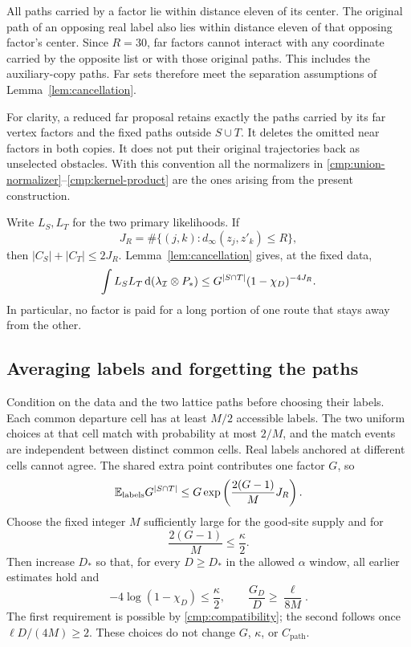 All paths carried by a factor lie within distance eleven of its center.
The original path of an opposing real label also lies within distance eleven
of that opposing factor's center. Since $R=30$, far factors cannot interact
with any coordinate carried by the opposite list or with those original
paths. This includes the auxiliary-copy paths. Far sets therefore meet the
separation assumptions of Lemma~\ref{lem:cancellation}.

For clarity, a reduced far proposal retains exactly the paths carried by
its far vertex factors and the fixed paths outside $S\cup T$. It deletes
the omitted near factors in both copies. It does not put their original
trajectories back as unselected obstacles. With this convention all the
normalizers in \eqref{cmp:union-normalizer}--\eqref{cmp:kernel-product}
are the ones arising from the present construction.

Write $L_S,L_T$ for the two primary likelihoods. If
\[
 J_R=\#\{(j,k):d_\infty(z_j,z'_k)\le R\},
\]
then $|C_S|+|C_T|\le2J_R$. Lemma~\ref{lem:cancellation} gives, at the
fixed data,
\begin{equation}\label{cmp:two-choice-bound}
 \int L_SL_T\,\mathrm d(\lambda_{\mathcal I}\otimes P_*)
 \le G^{|S\cap T|}(1-\chi_D)^{-4J_R}.
\end{equation}
In particular, no factor is paid for a long portion of one route that stays
away from the other.

\subsection{Averaging labels and forgetting the paths}

Condition on the data and the two lattice paths before choosing their labels.
Each common departure cell has at least $M/2$ accessible labels. The two
uniform choices at that cell match with probability at most $2/M$, and the
match events are independent between distinct common cells. Real labels
anchored at different cells cannot agree. The shared extra point contributes
one factor $G$, so
\begin{equation}\label{cmp:label-average}
 \mathbb E_{\mathrm{labels}}G^{|S\cap T|}
 \le G\exp\left(\frac{2(G-1)}M J_R\right).
\end{equation}
Choose the fixed integer $M$ sufficiently large for the good-site supply
and for
\begin{equation}\label{cmp:M-choice}
 \frac{2(G-1)}M\le\frac\kappa2.
\end{equation}
Then increase $D_*$ so that, for every $D\ge D_*$ in the allowed $\alpha$
window, all earlier estimates hold and
\begin{equation}\label{cmp:D-choice}
 -4\log(1-\chi_D)\le\frac\kappa2,
 \qquad
 \frac{G_D}{D}\ge\frac\ell{8M}.
\end{equation}
The first requirement is possible by \eqref{cmp:compatibility}; the second
follows once $\ell D/(4M)\ge2$. These choices do not change $G$, $\kappa$,
or $C_{\mathrm{path}}$.

